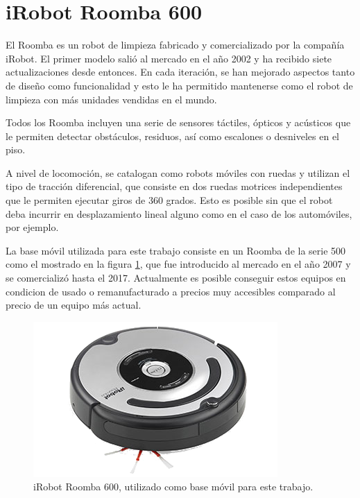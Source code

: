 \section{iRobot Roomba 600}\label{sec:roomba}

El Roomba es un robot de limpieza fabricado y comercializado por la compañía iRobot. El primer modelo salió al mercado en el año 2002 y ha recibido siete actualizaciones desde entonces. En cada iteración, se han mejorado aspectos tanto de diseño como funcionalidad y esto le ha permitido mantenerse como el robot de limpieza con más unidades vendidas en el mundo.

Todos los Roomba incluyen una serie de sensores táctiles, ópticos y acústicos que le permiten detectar obstáculos, residuos, así como escalones o desniveles en el piso.

A nivel de locomoción, se catalogan como robots móviles con ruedas y utilizan el tipo de tracción diferencial, que consiste en dos ruedas motrices independientes que le permiten ejecutar giros de 360 grados. Esto es posible sin que el robot deba incurrir en desplazamiento lineal alguno como en el caso de los automóviles, por ejemplo.

La base móvil utilizada para este trabajo consiste en un Roomba de la serie 500 como el mostrado en la figura \ref{fig:roomba}, que fue introducido al mercado en el año 2007 y se comercializó hasta el 2017. Actualmente es posible conseguir estos equipos en condicion de usado o remanufacturado a precios muy accesibles comparado al precio de un equipo más actual.

\begin{figure}[ht]
    \centering
    \includegraphics[scale=2.8]{./Figures/roomba.png}
    \caption{iRobot Roomba 600, utilizado como base móvil para este trabajo\protect\footnotemark.}
    \label{fig:roomba}
\end{figure}


